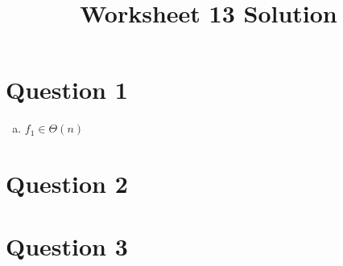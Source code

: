 \documentclass[12pt]{article}
\begin{document}
\title{Worksheet 13 Solution}
\maketitle

\section*{Question 1}
\begin{enumerate}[a.]
    \item

    $f_1 \in \Theta (n)$
\end{enumerate}

\section*{Question 2}

\section*{Question 3}
\end{document}

